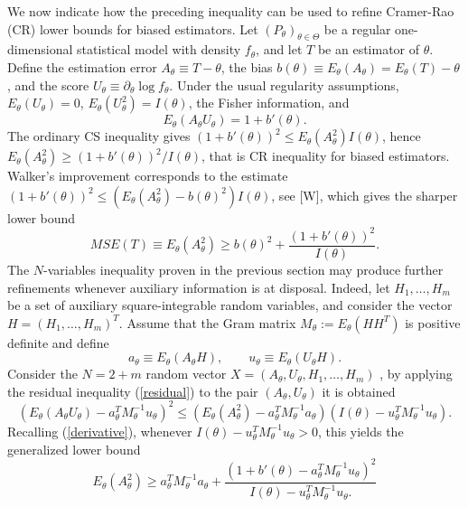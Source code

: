 \documentclass[10pt,a4paper]{amsart}
\begin{document}
We now indicate how the preceding inequality can be used to refine Cramer-Rao (CR) lower bounds for biased estimators. Let $(P_\theta)_{\theta\in\Theta}$ be a regular one-dimensional statistical model with density $f_\theta$, and let $T$ be an estimator of $\theta$. Define the estimation error $A_\theta \equiv T-\theta$, the bias $b(\theta)\equiv E_\theta(A_\theta)=E_\theta(T)-\theta$, and the score $U_\theta \equiv \partial_\theta\log f_\theta$. Under the usual regularity assumptions, $E_\theta(U_\theta)=0$, $E_\theta(U_\theta^2)=I(\theta)$, the Fisher information, and
\begin{equation}\label{derivative}
E_\theta(A_\theta U_\theta)=1+b'(\theta).
\end{equation}
The ordinary CS inequality gives $\left(1+b'(\theta)\right)^2\leq E_\theta(A_\theta^2)I(\theta)$,
hence $E_\theta(A_\theta^2)\geq (1+b'(\theta))^2/I(\theta)$, that is CR inequality for biased estimators. Walker's improvement corresponds to the estimate $\left(1+b'(\theta)\right)^2\leq\left(E_\theta(A_\theta^2)-b(\theta)^2\right)I(\theta)$, see [W], which gives the sharper lower bound
\begin{equation}\label{Walker}
MSE(T)\equiv E_\theta(A_\theta^2)
\geq
b(\theta)^2+
\frac{\left(1+b'(\theta)\right)^2}{I(\theta)}.
\end{equation}
The $N$-variables inequality proven in the previous section may produce further refinements whenever auxiliary information is at disposal. Indeed, let $H_1,\dots,H_m$ be a set of auxiliary square-integrable random variables, and consider the vector $H=(H_1,\dots,H_m)^T$. Assume that the Gram matrix $M_\theta:=E_\theta(HH^T)$ is positive definite and define
\begin{equation}
a_\theta \equiv E_\theta(A_\theta H),
\qquad
u_\theta \equiv E_\theta(U_\theta H).
\end{equation}
Consider the $N=2+m$ random vector $X=(A_\theta,U_\theta,H_1,\ldots,H_m)$ , by applying the residual inequality (\ref{residual}) to the pair $(A_\theta,U_\theta)$ it is obtained
$$
\left(
E_\theta(A_\theta U_\theta)-a_\theta^TM_\theta^{-1}u_\theta
\right)^2
\leq
\left(
E_\theta(A_\theta^2)-a_\theta^TM_\theta^{-1}a_\theta
\right)
\left(
I(\theta)-u_\theta^TM_\theta^{-1}u_\theta
\right).
$$
Recalling  (\ref{derivative}), whenever $I(\theta)-u_\theta^TM_\theta^{-1}u_\theta>0$, this yields the generalized lower bound
\begin{equation}\label{general_CR}
E_\theta(A_\theta^2)
\geq
a_\theta^TM_\theta^{-1}a_\theta
+
\frac{
\left(
1+b'(\theta)-a_\theta^TM_\theta^{-1}u_\theta
\right)^2
}{
I(\theta)-u_\theta^TM_\theta^{-1}u_\theta.
}
\end{equation}
\end{document}
